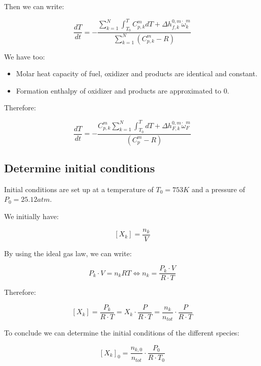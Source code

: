 \documentclass[11pt, a4paper]{article} %
\begin{document}
Then we can write:

\begin{equation}
    \frac{ dT }{ dt } = - \frac{ \sum_{k=1}^{N} \int_{T_0}^{T} C^m_{p,k} dT + \Delta h_{f,k}^{0,m} \dot {\omega}_k^m } { \sum_{k=1}^{N} \left( C^m_{p,k} - R \right) }
\end{equation}

We have too:

\begin{itemize}
    \item Molar heat capacity of fuel, oxidizer and products are identical and constant.
    \item Formation enthalpy of oxidizer and products are approximated to 0.
\end{itemize}

Therefore:

\begin{equation}
    \frac{ dT }{ dt } = - \frac{ C^m_{p,k} \sum_{k=1}^{N} \int_{T_0}^{T} dT + \Delta h_{F,k}^{0,m} \dot {\omega}_F^m } { \left( C^m_{p} - R \right) }
\end{equation}

\subsection{Determine initial conditions}

Initial conditions are set up at a temperature of $T_0 = 753 K$ and a pressure of $P_0 = 25.12 atm$.

We initially have:

\begin{equation}
    \left[ X_k \right] = \frac{n_k}{V}
\end{equation}

By using the ideal gas law, we can write:

\begin{equation}
    P_k \cdot V = n_k RT \iff n_k  = \frac{P_k \cdot V}{R \cdot T}
\end{equation}

Therefore:

\begin{equation}
    \left[ X_k \right] = \frac{P_k}{R \cdot T} = X_k \cdot \frac{P}{R \cdot T} = \frac{n_k}{n_{tot}} \cdot \frac{P}{R \cdot T}
\end{equation}

To conclude we can determine the initial conditions of the different species:

\begin{equation}
    \boxed{
        \left[ X_k \right]_0 = \frac{n_{k,0}}{n_{tot}} \cdot \frac{P_0}{R \cdot T_0}
    }
\end{equation}
\end{document}
